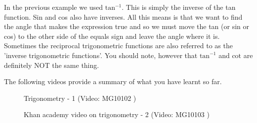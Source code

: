 \label{m39408*eip-200}In the previous example we used \begin{math}{\mathrm{tan}}^{-1}\end{math}. This is simply the inverse of the tan function. Sin and cos also have inverses. All this means is that we want to find the angle that makes the expression true and so we must move the tan (or sin or cos) to the other side of the equals sign and leave the angle where it is. Sometimes the reciprocal trigonometric functions are also referred to as the 'inverse trigonometric functions'. You should note, however that \begin{math}{\mathrm{tan}}^{-1}\end{math} and \begin{math}\mathrm{cot}\end{math} are definitely NOT the same thing. \par \label{m39408*eip-358}The following videos provide a summary of what you have learnt so far.

    \setcounter{subfigure}{0}


	\begin{figure}[H] %
    
    
    \textnormal{Trigonometry - 1}\vspace{.1in} \nopagebreak
  \label{m39408*yt-media}\label{m39408*yt-video}
             { (Video:  MG10102 )}
      
      \vspace{2pt}
    \vspace{.1in}
    
    

 \end{figure}   

    \addtocounter{footnote}{-0}
    \par \label{m39408*eip-33}
    \setcounter{subfigure}{0}


	\begin{figure}[H] %
    
    
    \textnormal{Khan academy video on trigonometry - 2}\vspace{.1in} \nopagebreak
  \label{m39408*yt-media2}\label{m39408*yt-video2}
             { (Video:  MG10103 )}
      
      \vspace{2pt}
    \vspace{.1in}
    
    

 \end{figure}   

